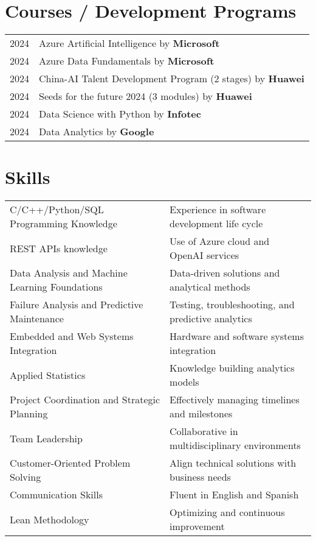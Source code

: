 \documentclass[a4paper,12pt]{article}
\begin{document}
\section{Courses / Development Programs}
\begin{tabularx}{\linewidth}{@{}l X@{}}	
2024 & Azure Artificial Intelligence by \textbf{Microsoft} \hfill  \\

2024 & Azure Data Fundamentals by \textbf{Microsoft} \hfill \normalsize \\

2024 & China-AI Talent Development Program (2 stages) by \textbf{Huawei} \hfill \\ 

2024 & Seeds for the future 2024 (3 modules) by \textbf{Huawei} \hfill \\

2024 & Data Science with Python by \textbf{Infotec} \hfill \\

2024 & Data Analytics by \textbf{Google} \hfill \\
\end{tabularx}

\section{Skills}
\begin{tabularx}{\linewidth}{@{}l X@{}}
C/C++/Python/SQL Programming Knowledge &  \normalsize{Experience in software development life cycle}\\
REST APIs knowledge &  \normalsize{Use of Azure cloud and OpenAI services}\\
Data Analysis and Machine Learning Foundations  &  \normalsize{Data-driven solutions and analytical methods}\\  
Failure Analysis and Predictive Maintenance  &  \normalsize{Testing, troubleshooting, and predictive analytics}\\  
Embedded and Web Systems Integration  &  \normalsize{Hardware and software systems integration}\\  
Applied Statistics  &  \normalsize{Knowledge building analytics models}\\  
Project Coordination and Strategic Planning  &  \normalsize{Effectively managing timelines and milestones}\\  
Team Leadership  &  \normalsize{Collaborative in multidisciplinary environments}\\  
Customer-Oriented Problem Solving  &  \normalsize{Align technical solutions with business needs}\\  
Communication Skills  &  \normalsize{Fluent in English and Spanish}\\  
Lean Methodology  &  \normalsize{Optimizing and continuous improvement}\\  
\end{tabularx}
\end{document}
